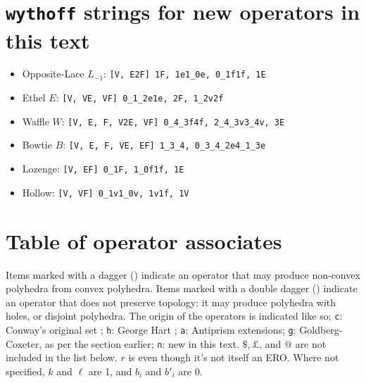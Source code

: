 \documentclass[12pt]{amsart}%
\begin{document}



\appendix
\section{\texttt{wythoff} strings for new operators in this text}
\begin{itemize}
  \item Opposite-Lace $L_{-1}$: \texttt{[V, E2F] 1F, 1e1\_0e, 0\_1f1f, 1E}
  \item Ethel $E$: \texttt{[V, VE, VF] 0\_1\_2e1e, 2F, 1\_2v2f}
  \item Waffle $W$: \texttt{[V, E, F, V2E, VF] 0\_4\_3f4f, 2\_4\_3v3\_4v, 3E}
  \item Bowtie $B$: \texttt{[V, E, F, VE, EF] 1\_3\_4, 0\_3\_4\_2e4\_1\_3e}
  \item Lozenge: \texttt{[V, EF] 0\_1F, 1\_0f1f, 1E}
  \item Hollow: \texttt{[V, VF] 0\_1v1\_0v, 1v1f, 1V}
\end{itemize}

\section{Table of operator associates}

Items marked with a dagger (\dag) indicate an operator that may produce
non-convex polyhedra from convex polyhedra. Items marked with a
double dagger (\ddag) indicate an operator that does not preserve topology:
it may produce polyhedra with holes, or disjoint polyhedra.
The origin of the operators is indicated like so;
\texttt{c}: Conway's original set \cite{conway};
\texttt{h}: George Hart \cite{hart00}\cite{hart98};
\texttt{a}: Antiprism extensions\cite{antiprism};
\texttt{g}: Goldberg-Coxeter, as per the section earlier;
\texttt{n}: new in this text.
$\$, \pounds$, and $@$ are not included in the list below. $r$ is even though
it's not itself an ERO. Where not specified, $k$ and $\ell$ are 1, and $b_i$
and $b'_i$ are 0.
\end{document}
